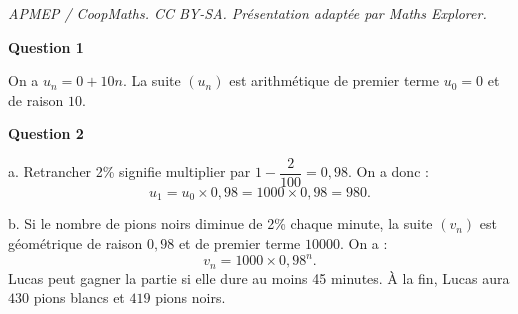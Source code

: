 \documentclass[10pt]{article}
\begin{document}
\noindent\textit{APMEP / CoopMaths. CC BY-SA. Présentation adaptée par Maths Explorer.}\par\medskip
\textbf{Question 1}
	
	On a $u_n = 0 + 10n$. La suite $(u_n)$ est arithmétique de premier terme $u_0 = 0$ et de raison $10$.
	
	\textbf{Question 2}
	
	a. Retrancher 2\% signifie multiplier par $1 - \dfrac{2}{100} = 0,98$. On a donc :
	\[
	u_1 = u_0 \times 0,98 = 1000 \times 0,98 = 980.
	\]
	
	b. Si le nombre de pions noirs diminue de 2\% chaque minute, la suite $(v_n)$ est géométrique de raison $0,98$ et de premier terme $10 000$. On a :
	\[
	v_n = 1000 \times 0,98^n.
	\]
	Lucas peut gagner la partie si elle dure au moins 45 minutes. À la fin, Lucas aura $430$ pions blancs et $419$ pions noirs.
\end{document}
